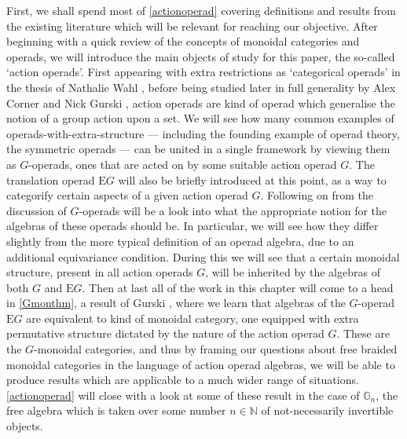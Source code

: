 First, we shall spend most of \cref{actionoperad} covering definitions and results from the existing literature which will be relevant for reaching our objective. After beginning with a quick review of the concepts of monoidal categories and operads, we will introduce the main objects of study for this paper, the so-called `action operads'. First appearing with extra restrictions as `categorical operads' in the thesis of Nathalie Wahl \cite{ribbon1}, before being studied later in full generality by Alex Corner and Nick Gurski \cite{ogge}, action operads are kind of operad which generalise the notion of a group action upon a set. We will see how many common examples of operads-with-extra-structure --- including the founding example of operad theory, the symmetric operads \cite{gils} --- can be united in a single framework by viewing them as $G$-operads, ones that are acted on by some suitable action operad $G$. The translation operad $\mathrm{E}G$ will also be briefly introduced at this point, as a way to categorify certain aspects of a given action operad $G$. Following on from the discussion of $G$-operads will be a look into what the appropriate notion for the algebras of these operads should be. In particular, we will see how they differ slightly from the more typical definition of an operad algebra, due to an additional equivariance condition. During this we will see that a certain monoidal structure, present in all action operads $G$, will be inherited by the algebras of both $G$ and $\mathrm{E}G$. Then at last all of the work in this chapter will come to a head in \cref{Gmonthm}, a result of Gurski \cite{operadborel}, where we learn that algebras of the $G$-operad $\mathrm{E}G$ are equivalent to kind of monoidal category, one equipped with extra permutative structure dictated by the nature of the action operad $G$. These are the $G$-monoidal categories, and thus by framing our questions about free braided monoidal categories in the language of action operad algebras, we will be able to produce results which are applicable to a much wider range of situations. \cref{actionoperad} will close with a look at some of these result in the case of $\mathbb{G}_n$, the free algebra which is taken over some number $n \in \mathbb{N}$ of not-necessarily invertible objects.

